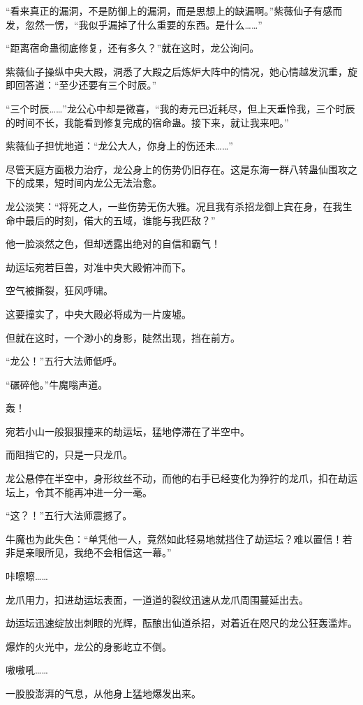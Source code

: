\begin{this_body}
“看来真正的漏洞，不是防御上的漏洞，而是思想上的缺漏啊。”紫薇仙子有感而发，忽然一愣，“我似乎漏掉了什么重要的东西。是什么……”

“距离宿命蛊彻底修复，还有多久？”就在这时，龙公询问。

紫薇仙子操纵中央大殿，洞悉了大殿之后炼炉大阵中的情况，她心情越发沉重，旋即回答道：“至少还要有三个时辰。”

“三个时辰……”龙公心中却是微喜，“我的寿元已近耗尽，但上天垂怜我，三个时辰的时间不长，我能看到修复完成的宿命蛊。接下来，就让我来吧。”

紫薇仙子担忧地道：“龙公大人，你身上的伤还未……”

尽管天庭方面极力治疗，龙公身上的伤势仍旧存在。这是东海一群八转蛊仙围攻之下的成果，短时间内龙公无法治愈。

龙公淡笑：“将死之人，一些伤势无伤大雅。况且我有杀招龙御上宾在身，在我生命中最后的时刻，偌大的五域，谁能与我匹敌？”

他一脸淡然之色，但却透露出绝对的自信和霸气！

劫运坛宛若巨兽，对准中央大殿俯冲而下。

空气被撕裂，狂风呼啸。

这要撞实了，中央大殿必将成为一片废墟。

但就在这时，一个渺小的身影，陡然出现，挡在前方。

“龙公！”五行大法师低呼。

“碾碎他。”牛魔嗡声道。

轰！

宛若小山一般狠狠撞来的劫运坛，猛地停滞在了半空中。

而阻挡它的，只是一只龙爪。

龙公悬停在半空中，身形纹丝不动，而他的右手已经变化为狰狞的龙爪，扣在劫运坛上，令其不能再冲进一分一毫。

“这？！”五行大法师震撼了。

牛魔也为此失色：“单凭他一人，竟然如此轻易地就挡住了劫运坛？难以置信！若非是亲眼所见，我绝不会相信这一幕。”

咔嚓嚓……

龙爪用力，扣进劫运坛表面，一道道的裂纹迅速从龙爪周围蔓延出去。

劫运坛迅速绽放出刺眼的光辉，酝酿出仙道杀招，对着近在咫尺的龙公狂轰滥炸。

爆炸的火光中，龙公的身影屹立不倒。

嗷嗷吼……

一股股澎湃的气息，从他身上猛地爆发出来。


\end{this_body}
